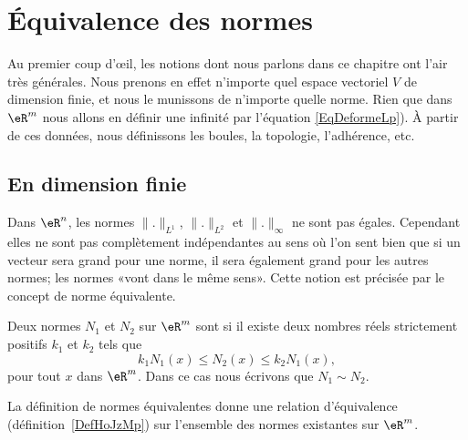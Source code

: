 \section{Équivalence des normes}
\label{normes_equiv}

Au premier coup d'œil, les notions dont nous parlons dans ce chapitre ont l'air très générales. Nous prenons en effet n'importe quel espace vectoriel \( V\) de dimension finie, et nous le munissons de n'importe quelle norme. Rien que dans \( \eR^m\) nous allons en définir une infinité par l'équation \eqref{EqDeformeLp}). À partir de ces données, nous définissons les boules, la topologie, l'adhérence, etc.

\subsection{En dimension finie}

Dans \( \eR^n\), les normes \( \| . \|_{L^1}\), \( \| . \|_{L^2}\) et \( \| . \|_{\infty}\) ne sont pas égales. Cependant elles ne sont pas complètement indépendantes au sens où l'on sent bien que si un vecteur sera grand pour une norme, il sera également grand pour les autres normes; les normes «vont dans le même sens». Cette notion est précisée par le concept de norme équivalente.

\begin{definition}      \label{DefEquivNorm}
	Deux normes \( N_1\) et \( N_2\) sur \( \eR^m\) sont  si il existe deux nombres réels strictement positifs \( k_1\) et \( k_2\) tels que
	\begin{equation}
		k_1N_1(x)\leq N_2(x)\leq k_2 N_1(x),
	\end{equation}
	pour tout \( x\) dans \( \eR^m\). Dans ce cas nous écrivons que \( N_1\sim N_2\).
\end{definition}

\begin{lemma}       \label{LEMooHAITooWdtLAN}
	La définition de normes équivalentes donne une relation d'équivalence (définition~\ref{DefHoJzMp}) sur l'ensemble des normes existantes sur \( \eR^m\).
\end{lemma}

